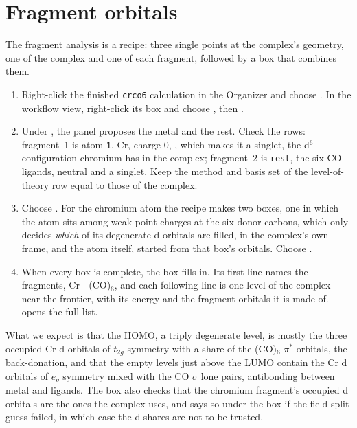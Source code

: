 \section{Fragment orbitals}
The fragment analysis is a recipe: three single points at the complex's geometry, one of the complex and one of each fragment, followed by a box that combines them.
\begin{enumerate}
	\item Right-click the finished \texttt{crco6} calculation in the Organizer and choose . In the workflow view, right-click its box and choose , then .
	\item Under , the panel proposes the metal and the rest. Check the rows: fragment~1 is atom \texttt{1}, Cr, charge 0,  , which makes it a singlet, the d$^6$ configuration chromium has in the complex; fragment~2 is \texttt{rest}, the six CO ligands, neutral and a singlet. Keep the method and basis set of the level-of-theory row equal to those of the complex.
	\item Choose . For the chromium atom the recipe makes two boxes, one in which the atom sits among weak point charges at the six donor carbons, which only decides \emph{which} of its degenerate d orbitals are filled, in the complex's own frame, and the atom itself, started from that box's orbitals. Choose .
	\item When every box is complete, the  box fills in. Its first line names the fragments, Cr $|$ (CO)$_6$, and each following line is one level of the complex near the frontier, with its energy and the fragment orbitals it is made of.  opens the full list.
\end{enumerate}

What we expect is that the HOMO, a triply degenerate level, is mostly the three occupied Cr d orbitals of $t_{2g}$ symmetry with a share of the (CO)$_6$ $\pi^*$ orbitals, the back-donation, and that the empty levels just above the LUMO contain the Cr d orbitals of $e_g$ symmetry mixed with the CO $\sigma$ lone pairs, antibonding between metal and ligands. The box also checks that the chromium fragment's occupied d orbitals are the ones the complex uses, and says so under the box if the field-split guess failed, in which case the d shares are not to be trusted.

